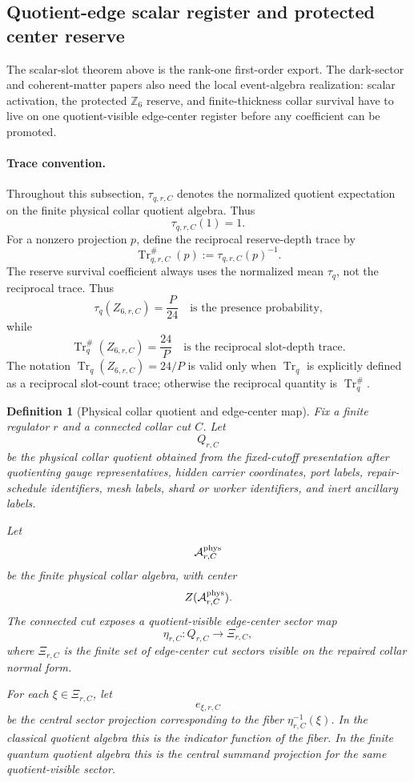 \documentclass[11pt]{article}
\newtheorem{definition}[theorem]{Definition}
\theoremstyle{remark}
\theoremstyle{plain}
\begin{document}
\subsection{Quotient-edge scalar register and protected center reserve}
\label{sec:quotient-edge-scalar-z6}

The scalar-slot theorem above is the rank-one first-order export.  The
dark-sector and coherent-matter papers also need the local event-algebra
realization: scalar activation, the protected \(\mathbb Z_6\) reserve, and
finite-thickness collar survival have to live on one quotient-visible
edge-center register before any coefficient can be promoted.

\paragraph{Trace convention.}
Throughout this subsection, \(\tau_{q,r,C}\) denotes the normalized quotient
expectation on the finite physical collar quotient algebra. Thus
\[
\tau_{q,r,C}(1)=1.
\]
For a nonzero projection \(p\), define the reciprocal reserve-depth trace by
\[
\operatorname{Tr}^{\#}_{q,r,C}(p):=\tau_{q,r,C}(p)^{-1}.
\]
The reserve survival coefficient always uses the normalized mean \(\tau_q\), not
the reciprocal trace. Thus
\[
\tau_q(Z_{6,r,C})=\frac{P}{24}
\quad\text{is the presence probability,}
\]
while
\[
\operatorname{Tr}^{\#}_q(Z_{6,r,C})=\frac{24}{P}
\quad\text{is the reciprocal slot-depth trace.}
\]
The notation \(\operatorname{Tr}_q(Z_{6,r,C})=24/P\) is valid only when
\(\operatorname{Tr}_q\) is explicitly defined as a reciprocal slot-count trace;
otherwise the reciprocal quantity is \(\operatorname{Tr}^{\#}_q\).

\begin{definition}[Physical collar quotient and edge-center map]
\label{def:physical-collar-edge-center-map}
Fix a finite regulator \(r\) and a connected collar cut \(C\). Let
\[
Q_{r,C}
\]
be the physical collar quotient obtained from the fixed-cutoff presentation
after quotienting gauge representatives, hidden carrier coordinates, port
labels, repair-schedule identifiers, mesh labels, shard or worker identifiers,
and inert ancillary labels.

Let
\[
\mathcal A^{\rm phys}_{r,C}
\]
be the finite physical collar algebra, with center
\[
Z(\mathcal A^{\rm phys}_{r,C}).
\]
The connected cut exposes a quotient-visible edge-center sector map
\[
\eta_{r,C}:Q_{r,C}\longrightarrow \Xi_{r,C},
\]
where \(\Xi_{r,C}\) is the finite set of edge-center cut sectors visible on
the repaired collar normal form.

For each \(\xi\in\Xi_{r,C}\), let
\[
e_{\xi,r,C}
\]
be the central sector projection corresponding to the fiber
\(\eta_{r,C}^{-1}(\xi)\). In the classical quotient algebra this is the
indicator function of the fiber. In the finite quantum quotient algebra this is
the central summand projection for the same quotient-visible sector.
\end{definition}
\end{document}
